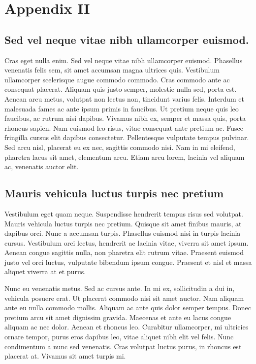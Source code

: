 
\chapter{Appendix II}

\section{Sed vel neque vitae nibh ullamcorper euismod.}
Cras eget nulla enim. Sed vel neque vitae nibh ullamcorper euismod. Phasellus venenatis felis sem, sit amet accumsan magna ultrices quis. Vestibulum ullamcorper scelerisque augue commodo commodo. Cras commodo ante ac consequat placerat. Aliquam quis justo semper, molestie nulla sed, porta est. Aenean arcu metus, volutpat non lectus non, tincidunt varius felis. Interdum et malesuada fames ac ante ipsum primis in faucibus. Ut pretium neque quis leo faucibus, ac rutrum nisi dapibus. Vivamus nibh ex, semper et massa quis, porta rhoncus sapien. Nam euismod leo risus, vitae consequat ante pretium ac. Fusce fringilla cursus elit dapibus consectetur. Pellentesque vulputate tempus pulvinar. Sed arcu nisl, placerat eu ex nec, sagittis commodo nisi. Nam in mi eleifend, pharetra lacus sit amet, elementum arcu. Etiam arcu lorem, lacinia vel aliquam ac, venenatis auctor elit.

\section{Mauris vehicula luctus turpis nec pretium}
Vestibulum eget quam neque. Suspendisse hendrerit tempus risus sed volutpat. Mauris vehicula luctus turpis nec pretium. Quisque sit amet finibus mauris, at dapibus orci. Nunc a accumsan turpis. Phasellus euismod nisi in turpis lacinia cursus. Vestibulum orci lectus, hendrerit ac lacinia vitae, viverra sit amet ipsum. Aenean congue sagittis nulla, non pharetra elit rutrum vitae. Praesent euismod justo vel orci luctus, vulputate bibendum ipsum congue. Praesent et nisl et massa aliquet viverra at et purus.

Nunc eu venenatis metus. Sed ac cursus ante. In mi ex, sollicitudin a dui in, vehicula posuere erat. Ut placerat commodo nisi sit amet auctor. Nam aliquam ante eu nulla commodo mollis. Aliquam ac ante quis dolor semper tempus. Donec pretium arcu sit amet dignissim gravida. Maecenas et ante eu lacus congue aliquam ac nec dolor. Aenean et rhoncus leo. Curabitur ullamcorper, mi ultricies ornare tempor, purus eros dapibus leo, vitae aliquet nibh elit vel felis. Nunc condimentum a nunc sed venenatis. Cras volutpat luctus purus, in rhoncus est placerat at. Vivamus sit amet turpis mi.